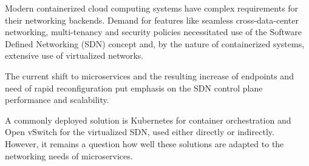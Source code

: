 

% 
% 
% 



Modern containerized cloud computing systems have complex requirements for their networking backends. Demand for features like seamless cross-data-center networking, multi-tenancy and security policies necessitated use of the Software Defined Networking (SDN) concept and, by the nature of containerized systems, extensive use of virtualized networks.

The current shift to microservices and the resulting increase of endpoints and need of rapid reconfiguration put emphasis on the SDN control plane performance and scalability.

A commonly deployed solution is Kubernetes for container orchestration and Open vSwitch for the virtualized SDN, used either directly or indirectly. However, it remains a question how well these solutions are adapted to the networking needs of microservices.


